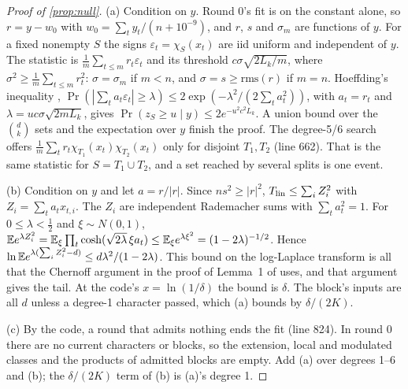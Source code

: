 \begin{proof}[Proof of \cref{prop:null}]
(a) Condition on $y$. Round 0's fit is on the constant alone, so $r=y-w_0$ with $w_0=\sum_ty_t/(n+10^{-9})$, and $r$, $s$ and $\sigma_m$ are functions of $y$. For a fixed nonempty $S$ the signs $\varepsilon_t=\chi_S(x_t)$ are iid uniform and independent of $y$. The statistic is $\frac1m\sum_{t\le m}r_t\varepsilon_t$ and its threshold $c\sigma\sqrt{2L_k/m}$, where $\sigma^2\ge\frac1m\sum_{t\le m}r_t^2$: $\sigma=\sigma_m$ if $m<n$, and $\sigma=s\ge\mathrm{rms}(r)$ if $m=n$. Hoeffding's inequality \cite{hoeffding1963probability}, $\Pr(|\sum_ta_t\varepsilon_t|\ge\lambda)\le2\exp(-\lambda^2/(2\sum_ta_t^2))$, with $a_t=r_t$ and $\lambda=uc\sigma\sqrt{2mL_k}$, gives $\Pr(z_S\ge u\mid y)\le2e^{-u^2c^2L_k}$. A union bound over the $\binom dk$ sets and the expectation over $y$ finish the proof. The degree-5/6 search offers $\frac1m\sum_tr_t\chi_{T_1}(x_t)\chi_{T_2}(x_t)$ only for disjoint $T_1,T_2$ (line 662). That is the same statistic for $S=T_1\cup T_2$, and a set reached by several splits is one event.

(b) Condition on $y$ and let $a=r/|r|$. Since $ns^2\ge|r|^2$, $T_{\rm lin}\le\sum_iZ_i^2$ with $Z_i=\sum_ta_tx_{t,i}$. The $Z_i$ are independent Rademacher sums with $\sum_ta_t^2=1$. For $0\le\lambda<\frac12$ and $\xi\sim N(0,1)$, $\mathbb{E} e^{\lambda Z_i^2}=\mathbb{E}_\xi\prod_t\cosh(\sqrt{2\lambda}\,\xi a_t)\le\mathbb{E}_\xi e^{\lambda\xi^2}=(1-2\lambda)^{-1/2}$. Hence $\ln\mathbb{E} e^{\lambda(\sum_iZ_i^2-d)}\le d\lambda^2/(1-2\lambda)$. This bound on the log-Laplace transform is all that the Chernoff argument in the proof of Lemma~1 of \cite{laurent2000adaptive} uses, and that argument gives the tail. At the code's $x=\ln(1/\delta)$ the bound is $\delta$. The block's inputs are all $d$ unless a degree-1 character passed, which (a) bounds by $\delta/(2K)$.

(c) By the code, a round that admits nothing ends the fit (line 824). In round 0 there are no current characters or blocks, so the extension, local and modulated classes and the products of admitted blocks are empty. Add (a) over degrees 1--6 and (b); the $\delta/(2K)$ term of (b) is (a)'s degree 1.
\end{proof}


